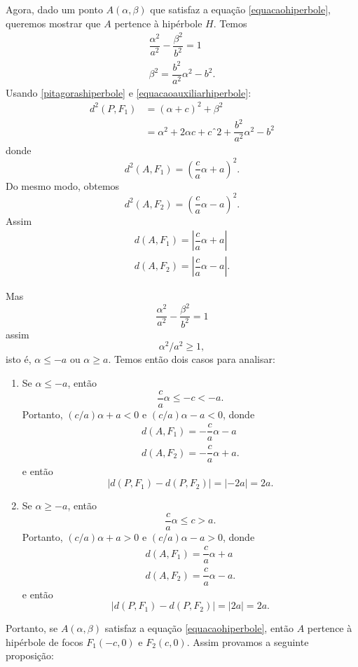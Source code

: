 Agora, dado um ponto $A(\alpha,\beta)$ que satisfaz a equa\c{c}\~ao \eqref{equacaohiperbole}, queremos mostrar que $A$ pertence \`a hip\'erbole $H$. Temos
\begin{align}
  \dfrac{\alpha^2}{a^2} - \dfrac{\beta^2}{b^2} = 1\nonumber\\
  \beta^2 = \dfrac{b^2}{a^2}\alpha^2 - b^2.\label{equacaoauxiliarhiperbole}
\end{align}
Usando \eqref{pitagorashiperbole} e \eqref{equacaoauxiliarhiperbole}:
\begin{align*}
  d^2(P,F_1) &= (\alpha + c)^2 + \beta^2\\
  &= \alpha^2 + 2\alpha c + cˆ2 + \dfrac{b^2}{a^2}\alpha^2 - b^2
\end{align*}
donde
\[
  d^2(A,F_1) = \left(\dfrac{c}{a}\alpha + a\right)^2.
\]
Do mesmo modo, obtemos
\[
  d^2(A,F_2) = \left(\dfrac{c}{a}\alpha - a\right)^2.
\]
Assim
\begin{align}
  d(A,F_1) = \left|\dfrac{c}{a}\alpha + a\right|\\
  d(A,F_2) = \left|\dfrac{c}{a}\alpha - a\right|.
\end{align}

Mas
\[
  \dfrac{\alpha^2}{a^2} - \dfrac{\beta^2}{b^2} = 1
\]
assim 
\begin{equation}\label{pontohiperbole}
  \alpha^2/a^2 \ge 1,
\end{equation}
isto \'e, $\alpha \le -a$ ou $\alpha \ge a$. Temos ent\~ao dois casos para analisar:
\begin{enumerate}
  \item Se $\alpha \le -a$, ent\~ao
  \[
    \dfrac{c}{a}\alpha \le -c < -a.
  \]
  Portanto, $(c/a)\alpha + a < 0$ e $(c/a)\alpha - a < 0$, donde
  \begin{align*}
  d(A,F_1) = -\dfrac{c}{a}\alpha - a\\
  d(A,F_2) = -\dfrac{c}{a}\alpha + a.
\end{align*}
e ent\~ao
\[
  | d(P,F_1) - d(P,F_2)| = |-2a| = 2a.
\]
\item Se $\alpha \ge -a$, ent\~ao
  \[
    \dfrac{c}{a}\alpha \le c > a.
  \]
  Portanto, $(c/a)\alpha + a > 0$ e $(c/a)\alpha - a > 0$, donde
  \begin{align*}
  d(A,F_1) = \dfrac{c}{a}\alpha + a\\
  d(A,F_2) = \dfrac{c}{a}\alpha - a.
\end{align*}
e ent\~ao
\[
  | d(P,F_1) - d(P,F_2)| = |2a| = 2a.
\]
\end{enumerate}
Portanto, se $A(\alpha,\beta)$ satisfaz a equa\c{c}\~ao \eqref{equacaohiperbole}, ent\~ao $A$ pertence \`a hip\'erbole de focos $F_1(-c,0)$ e $F_2(c,0)$. Assim provamos a seguinte proposi\c{c}\~ao:

